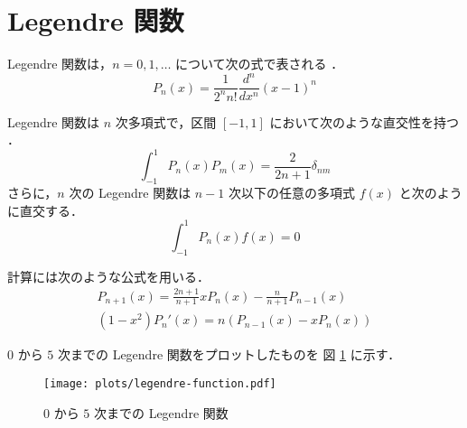 %

\section{Legendre 関数}\label{sec:special-function_legendre-function}

Legendre 関数は，$n=0,1,\ldots$ について次の式で表される
\cite[Section 5.2]{Morse1953}．
\begin{equation}
    P_n(x) = \frac{1}{2^n n!} \frac{d^n}{dx^n} (x - 1)^n
\end{equation}

Legendre 関数は $n$ 次多項式で，区間 $[-1, 1]$ において次のような直交性を持つ
\cite[Section 6.3]{Morse1953}．
\begin{equation}
    \int_{-1}^{1} P_n(x) P_m(x) = \frac{2}{2n + 1} \delta_{nm}
\end{equation}
さらに，$n$ 次の Legendre 関数は $n-1$ 次以下の任意の多項式 $f(x)$ と次のように直交する．
\begin{equation}
    \int_{-1}^{1} P_n(x) f(x) = 0
\end{equation}

計算には次のような公式を用いる\cite[Section6.3]{Morse1953}．
\begin{gather}
    P_{n+1}(x) = \frac{2n+1}{n+1} x P_n(x) - \frac{n}{n+1} P_{n-1}(x) \\
    (1-x^2) P_n'(x) = n(P_{n-1}(x) - x P_n(x))
\end{gather}

$0$ から $5$ 次までの Legendre 関数をプロットしたものを
図 \ref{fig:special-function_legendre-function} に示す．

\begin{figure}[tp]
    \centering
    \texttt{[image: plots/legendre-function.pdf]}
    \caption{$0$ から $5$ 次までの Legendre 関数}
    \label{fig:special-function_legendre-function}
\end{figure}
